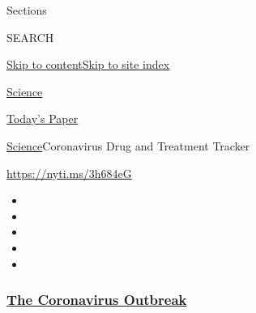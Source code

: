 Sections

SEARCH

\protect\hyperlink{site-content}{Skip to
content}\protect\hyperlink{site-index}{Skip to site index}

\href{https://www.nytimes3xbfgragh.onion/section/science}{Science}

\href{https://myaccount.nytimes3xbfgragh.onion/auth/login?response_type=cookie\&client_id=vi}{}

\href{https://www.nytimes3xbfgragh.onion/section/todayspaper}{Today's
Paper}

\href{/section/science}{Science}\textbar{}Coronavirus Drug and Treatment
Tracker

\url{https://nyti.ms/3h684eG}

\begin{itemize}
\item
\item
\item
\item
\item
\end{itemize}

\hypertarget{the-coronavirus-outbreak}{%
\subsubsection{\texorpdfstring{\href{https://www.nytimes3xbfgragh.onion/news-event/coronavirus?name=styln-coronavirus-national\&region=TOP_BANNER\&variant=undefined\&block=storyline_menu_recirc\&action=click\&pgtype=Interactive\&impression_id=15f07e60-e39b-11ea-89f5-73e141fcc61b}{The
Coronavirus
Outbreak}}{The Coronavirus Outbreak}}\label{the-coronavirus-outbreak}}

